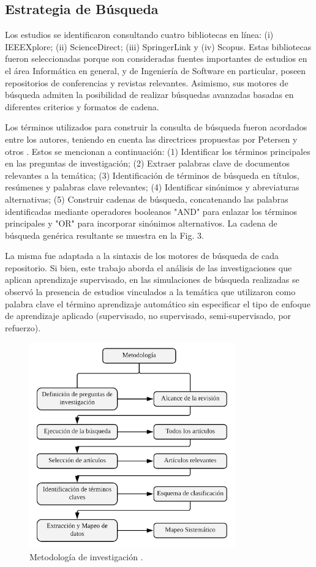 \documentclass[journal]{IEEEtran}
\begin{document}
\subsection{Estrategia de Búsqueda}

Los estudios se identificaron consultando cuatro bibliotecas en línea: (i) IEEEXplore; (ii) ScienceDirect; (iii) SpringerLink y (iv) Scopus. Estas bibliotecas fueron seleccionadas porque son consideradas fuentes importantes de estudios en el área Informática en general, y de Ingeniería de Software en particular, poseen repositorios de conferencias y revistas relevantes. Asimismo, sus motores de búsqueda admiten la posibilidad de realizar búsquedas avanzadas basadas en diferentes criterios y formatos de cadena.

Los términos utilizados para construir la consulta de búsqueda fueron acordados entre los autores, teniendo en cuenta las directrices propuestas por Petersen y otros \cite{petersen2008systematic}. Estos se mencionan a continuación: (1) Identificar los términos principales en las preguntas de investigación; (2) Extraer palabras clave de documentos relevantes a la temática; (3) Identificación de términos de búsqueda en títulos, resúmenes y palabras clave relevantes; (4) Identificar sinónimos y abreviaturas alternativas; (5) Construir cadenas de búsqueda, concatenando las palabras identificadas mediante operadores booleanos "AND" para enlazar los términos principales y "OR" para incorporar sinónimos alternativos. La cadena de búsqueda genérica resultante se muestra en la Fig. 3.

La misma fue adaptada a la sintaxis de los motores de búsqueda de cada repositorio. Si bien, este trabajo aborda el análisis de las investigaciones que aplican aprendizaje supervisado, en las simulaciones de búsqueda realizadas se observó la presencia de estudios vinculados a la temática que utilizaron como palabra clave el término aprendizaje automático sin especificar el tipo de enfoque de aprendizaje aplicado (supervisado, no supervisado, semi-supervisado, por refuerzo).

\begin{figure}[!t]
\centering
\includegraphics[width=3.5in]{figures/figure2_Guada.png}
\caption{Metodología de investigación \cite{petersen2008systematic}.}
\label{fig2}
\end{figure}
\end{document}
